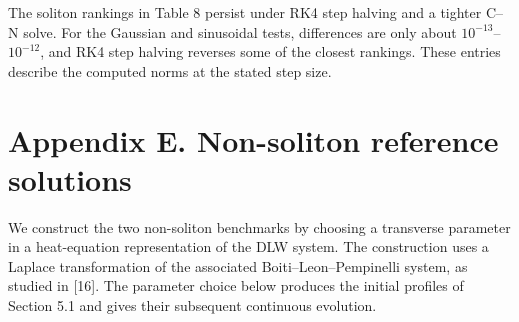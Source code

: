 \documentclass{article}
\theoremstyle{plain}
\theoremstyle{definition}
\begin{document}
The soliton rankings in Table 8 persist under RK4 step halving and a tighter C–N solve. For the Gaussian and sinusoidal tests, differences are only about \(10^{-13}\)–\(10^{-12}\), and RK4 step halving reverses some of the closest rankings. These entries describe the computed norms at the stated step size.

\FloatBarrier
\section*{Appendix E. Non-soliton reference solutions}
  

We construct the two non-soliton benchmarks by choosing a transverse parameter in a heat-equation representation of the DLW system. The construction uses a Laplace transformation of the associated Boiti–Leon–Pempinelli system, as studied in [16]. The parameter choice below produces the initial profiles of Section 5.1 and gives their subsequent continuous evolution.

 
\end{document}
